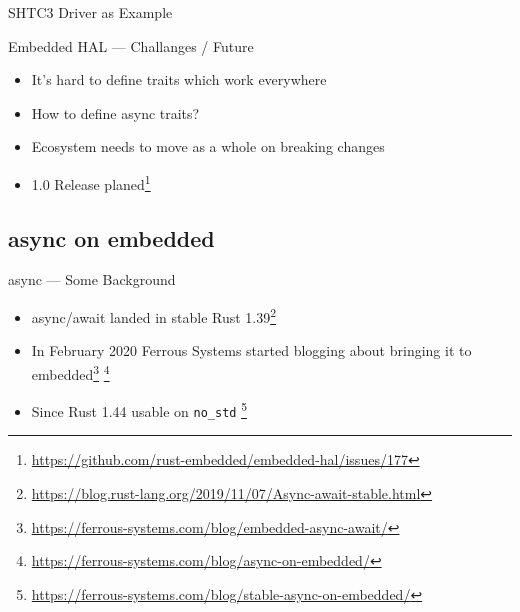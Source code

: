 \documentclass[aspectratio=1610,14pt,t]{beamer}
\begin{document}
\begin{frame}[c]{SHTC3 Driver as Example}
\end{frame}

\begin{frame}[c]{Embedded HAL --- Challanges / Future}
  \begin{itemize}
  \item It's hard to define traits which work everywhere

  \item How to define async traits?
  \item Ecosystem needs to move as a whole on breaking changes
  \item 1.0 Release planed\footnote{\url{https://github.com/rust-embedded/embedded-hal/issues/177}}
  \end{itemize}
\end{frame}

\subsection{async on embedded}
\begin{frame}[c]{async --- Some Background}
  \begin{itemize}
    \item async/await landed in stable Rust 1.39\footnote{\url{https://blog.rust-lang.org/2019/11/07/Async-await-stable.html}}
    \item In February 2020 Ferrous Systems started blogging about bringing it
      to embedded\footnote{\url{https://ferrous-systems.com/blog/embedded-async-await/}}
      \footnote{\url{https://ferrous-systems.com/blog/async-on-embedded/}}
    \item Since Rust 1.44 usable on \texttt{no\_std}
      \footnote{\url{https://ferrous-systems.com/blog/stable-async-on-embedded/}}
  \end{itemize}
\end{frame}
\end{document}
